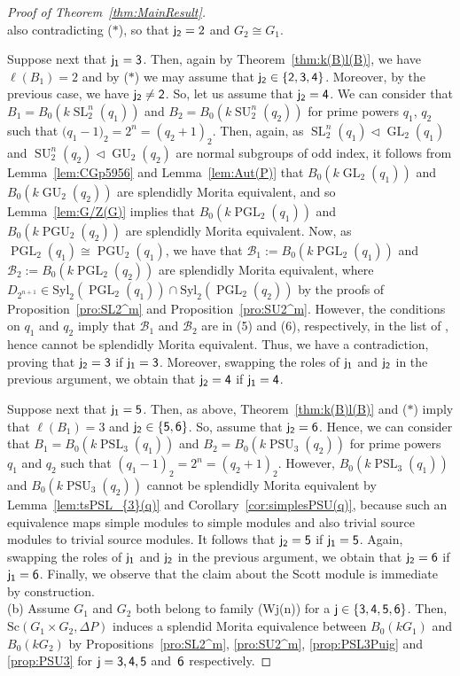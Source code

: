 \documentclass[12pt,a4paper]{amsart}
\theoremstyle{plain}\newtheorem{Theorem}{Theorem}[section]
\theoremstyle{plain}\newtheorem{Conjecture}[Theorem]{Conjecture}
\theoremstyle{plain}\newtheorem{Corollary}[Theorem]{Corollary}
\theoremstyle{plain}\newtheorem{Lemma}[Theorem]{Lemma}
\theoremstyle{plain}\newtheorem{Proposition}[Theorem]{Proposition}
\theoremstyle{definition}\newtheorem{Definition}[Theorem]{Definition}
\theoremstyle{definition}\newtheorem{Example}[Theorem]{Example}
\theoremstyle{definition}\newtheorem{Examples}[Theorem]{Examples}
\theoremstyle{definition}\newtheorem{Remark}[Theorem]{Remark}
\theoremstyle{definition}\newtheorem{Question}[Theorem]{Question}
\theoremstyle{definition}\newtheorem{Notation}[Theorem]{Notation}
\theoremstyle{definition}\newtheorem{Hypothesis}[Theorem]{Hypothesis}
\theoremstyle{definition}\newtheorem{Assumption}[Theorem]{Assumption}
\theoremstyle{definition}\newtheorem{Strategy}[Theorem]{Strategy}
\theoremstyle{definition}\newtheorem{Contents}[Theorem]{Contents}
\theoremstyle{definition}\newtheorem{Computations}[Theorem]{Computations}
\theoremstyle{definition}\newtheorem{Equivalences}[Theorem]{Equivalences}
\theoremstyle{definition}\newtheorem{Notation/Definition}[Theorem]{Notation/Definition}
\theoremstyle{definition}\newtheorem{noth}[Theorem]{}
\theoremstyle{plain}\newtheorem{Step}[Theorem]{Step}
\def\Syl{\mathrm{Syl}}
\newcommand{\PSL}{\operatorname{PSL}}
\newcommand{\SL}{\operatorname{SL}}
\newcommand{\PGL}{\operatorname{PGL}}
\newcommand{\GL}{\operatorname{GL}}
\newcommand{\PSU}{\operatorname{PSU}}
\newcommand{\SU}{\operatorname{SU}}
\newcommand{\PGU}{\operatorname{PGU}}
\newcommand{\GU}{\operatorname{GU}}
\begin{document}
\begin{proof}[Proof of Theorem~\ref{thm:MainResult}]
\[\] 
also contradicting ($\ast$), so that  ${\sf j_2} = 2$ and $G_{2}\cong G_{1}$. 
\par
Suppose next that $\sf j_1 = 3$.  Then, again by Theorem~\ref{thm:k(B)l(B)}, we have 
$\ell(B_{1})=2$ and by ($\ast$) we may assume that ${\sf j_2}\in\{{\sf 2,3,4}\}$. 
Moreover, by the previous case, we have ${\sf j_2}\neq {\sf 2}$. So, let us 
assume that ${\sf j_2}={\sf 4}$.
We can consider that $B_{1} =B_0(k\SL_2^n(q_1))$ and $B_{2}=B_0(k\SU_2^n(q_2))$ 
for prime powers $q_1$, $q_{2}$ such that  $({q_1-1)_2=2^n=(q_2+1)_2}$.  
Then, again, as $\SL_2^n(q_1)\lhd \GL_2(q_1)$ and $\SU_2^n(q_2)\lhd \GU_2(q_2)$ 
are normal subgroups of odd index, it follows from Lemma~\ref{lem:CGp5956} and Lemma~\ref{lem:Aut(P)}
that $B_0(k\GL_2(q_1))$ and $B_0(k\GU_2(q_2))$ are splendidly Morita 
equivalent,
and so 
Lemma~\ref{lem:G/Z(G)} implies that 
$B_0(k\PGL_2(q_1))$ and $B_0(k\PGU_2(q_2))$ are splendidly Morita equivalent.
Now, as $\PGL_2(q_1)\cong\PGU_2(q_1)$,  
we have that 
$\mathcal B_1:=B_0(k\PGL_2(q_1))$ and $\mathcal B_2:=B_0(k\PGL_2(q_2))$ are
splendidly Morita equivalent, 
where 
$D_{2^{n+1}}\in\Syl_2(\PGL_2(q_1))\cap\Syl_2(\PGL_2(q_2))$
by the proofs of Proposition~\ref{pro:SL2^m} and Proposition~\ref{pro:SU2^m}.
However, the conditions on $q_1$ and $q_2$ imply that 
$\mathcal B_1$ and $\mathcal B_2$  are in (5) and (6), respectively,
in the list of \cite[Theorem 1.1]{KL20a},  hence cannot be splendidly Morita equivalent.
Thus, we have a contradiction, proving  that ${\sf j_2}={\sf 3}$ if ${\sf j_1}={\sf 3}$. 
Moreover, swapping the roles of ${\sf j_1}$ and ${\sf j_2}$ in the previous argument, we 
obtain that ${\sf j_2}={\sf 4}$ if ${\sf j_1}={\sf 4}$. 
\par
Suppose next that ${\sf j_1}={\sf 5}$. Then, as above, Theorem~\ref{thm:k(B)l(B)} and ($\ast$) imply that $\ell(B_{1})=3$
 and ${\sf j_2}\in\{{\sf5},{\sf6}\}$.  So, assume  that ${\sf j_2}={\sf 6}$.
Hence, we can consider that $B_{1}=B_0(k\PSL_3(q_1))$ and $B_{2}=B_0(k\PSU_3(q_2))$ 
for prime powers $q_1$ and $q_2$ such that $(q_1-1)_2=2^n=(q_2+1)_2$.
However, $B_0(k\PSL_3(q_1))$ and $B_0(k\PSU_3(q_2))$ cannot be splendidly Morita equivalent 
by Lemma~\ref{lem:tsPSL_{3}(q)} and Corollary~\ref{cor:simplesPSU(q)}, because such an equivalence 
maps simple modules to simple modules and also trivial source modules to trivial source modules. 
 It follows that ${\sf j_2}={\sf 5}$ if ${\sf j_1}={\sf 5}$.
Again, swapping the roles of ${\sf j_1}$ and ${\sf j_2}$ in the previous argument, we 
obtain that ${\sf j_2}={\sf 6}$ if ${\sf j_1}={\sf 6}$. 
Finally, we observe that the claim about the Scott module is immediate by construction.\\
{\rm (b)}
Assume $G_1$ and $G_2$ both belong to family {\sf (Wj(n))} for a ${\sf j}\in\{\sf 3,{\sf4},{\sf5},{\sf6}\}$. 
Then, $\mathrm{Sc}(G_{1}\times G_{2}, \Delta P)$ induces a splendid Morita equivalence between  
$B_0(kG_{1})$ and $B_0(kG_{2})$ by Propositions~\ref{pro:SL2^m}, \ref{pro:SU2^m}, \ref{prop:PSL3Puig} and 
\ref{prop:PSU3} for $\sf j=\sf 3,4,5$ and~$\sf6$ respectively.
\end{proof}
\end{document}

